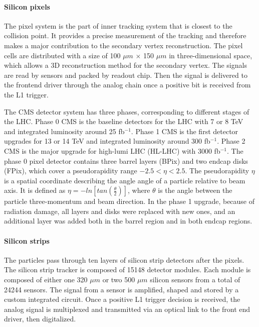 \paragraph{Silicon pixels}
The pixel system is the part of inner tracking system that is closest to the collision point. It provides a precise measurement of the tracking and therefore makes a major contribution to the secondary vertex reconstruction. The pixel cells are distributed with a size of 100 $\mu m$ $\times$ 150 $\mu m$ in three-dimensional space, which allows a 3D reconstruction method for the secondary vertex. The signals are read by sensors and packed by readout chip. Then the signal is delivered to the frontend driver through the analog chain once a positive bit is received from the L1 trigger.

The CMS detector system has three phases, corresponding to different stages of the LHC. Phase 0 CMS is the baseline detectors for the LHC with 7 or 8 TeV and integrated luminosity around 25 fb$^{-1}$. Phase 1 CMS is the first detector upgrades for 13 or 14 TeV and integrated luminosity around 300 fb$^{-1}$. Phase 2 CMS is the major upgrade for high-lumi LHC (HL-LHC) with 3000 fb$^{-1}$. The phase 0 pixel detector contains three barrel layers (BPix) and two endcap disks (FPix), which cover a pseudorapidity range $-2.5<\eta<2.5$. The pseudorapidity $\eta$ is a spatial coordinate describing the angle angle of a particle relative to beam axis. It is defined as $\eta = -ln[tan(\frac{\theta}{2})]$, where $\theta$ is the angle between the particle three-momentum and beam direction. In the phase 1 upgrade\cite{Klein:2140071}, because of radiation damage, all layers and disks were replaced with new ones, and an additional layer was added both in the barrel region and in both endcap regions.


\paragraph{Silicon strips}

The particles pass through ten layers of silicon strip detectors after the pixels. The silicon strip tracker is composed of 15148 detector modules. Each module is composed of either one 320 $\mu m$ or two 500 $\mu m$ silicon sensors from a total of 24244 sensors. The signal from a sensor is amplified, shaped and stored by a custom integrated circuit. Once a positive L1 trigger decision is received, the analog signal is multiplexed and transmitted via an optical link to the front end driver, then digitalized. 

